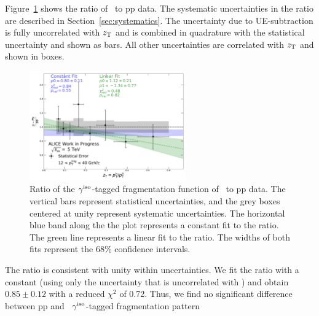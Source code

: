 Figure~\ref{ffRatio} shows the ratio of \pPb~to pp data. The systematic uncertainties in the ratio are described in Section~\ref{sec:systematics}. The uncertainty due to UE-subtraction is fully uncorrelated with $z_{\mathrm{T}}$ and is combined in quadrature with the statistical uncertainty and shown as bars. All other uncertainties are correlated with $z_{\mathrm{T}}$ and shown in boxes. 

\begin{figure}[h]
\center
\includegraphics[width=0.6\textwidth]{G-H_New/Ratio_Fits.pdf}
\caption{Ratio of the $\gamma^\mathrm{iso}$-tagged fragmentation function of \pPb~to pp data. The vertical bars represent statistical uncertainties, and the grey boxes centered at unity represent systematic uncertainties. The horizontal blue band along the the plot represents a constant fit to the ratio. The green line represents a linear fit to the ratio. The widths of both fits represent the 68\% confidence intervals.}
\label{ffRatio}
\end{figure}

The ratio is consistent with unity within uncertainties. We fit the ratio with a constant (using only the uncertainty that is uncorrelated with \zt) and obtain $0.85\pm0.12$ with a reduced $\chi^{2}$ of 0.72. Thus, we find no significant difference between pp and \pPb~$\gamma^\mathrm{iso}$-tagged fragmentation pattern